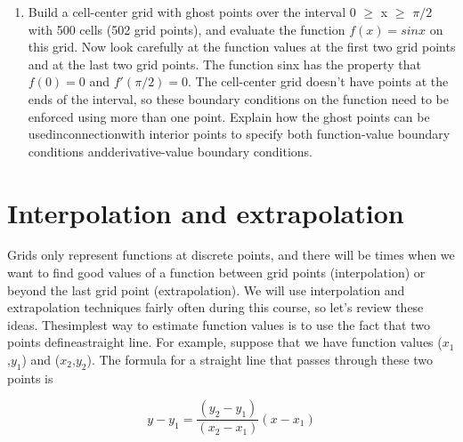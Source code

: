 \documentclass{book}
\theoremstyle{plain}
\theoremstyle{definition}
\numberwithin{exm}{chapter}
\theoremstyle{remark}
\theoremstyle{summary}
\theoremstyle{overview}
\begin{document}
\begin{enumerate}[label=(\alph*)]
\item Build a cell-center grid with ghost points over the interval 0 $\geq$ x $\geq$ $\pi/2$ with 500 cells (502 grid points), and evaluate the function $f (x)=sinx$ on this grid. Now look carefully at the function values at the first two grid points and at the last two grid points. The function sinx has the property that $f(0) = 0$ and $f\prime(\pi/2) = 0$. The cell-center grid doesn\rq t have points at the ends of the interval, so these boundary conditions on the function need to be enforced using more than one point. Explain how the ghost points can be usedinconnectionwith interior points to specify both function-value boundary conditions andderivative-value boundary conditions.	    
    \end{enumerate}  
    
    
 		\section*{Interpolation and extrapolation}
     
    Grids only represent functions at discrete points, and there will be times when we want to find good values of a function between grid points (interpolation) or beyond the last grid point (extrapolation). We will use interpolation and extrapolation techniques fairly often during this course, so let\rq s review these ideas. Thesimplest way to estimate function values is to use the fact that two points defineastraight line. For example, suppose that we have function values ($x_1$,$y_1$) and ($x_2$,$y_2$). The formula for a straight line that passes through these two points is   
    
\begin{equation} \label{eq:1}
    y - y_1 = \frac{(y_2-y_1)}{(x_2-x_1)}(x-x_1) 
\end{equation}  
  
\end{document}
